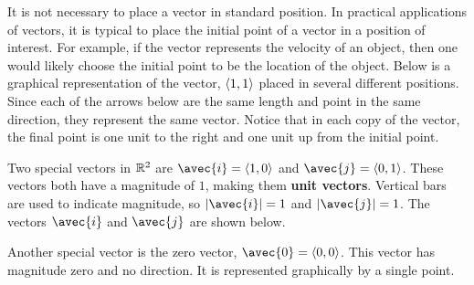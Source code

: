 \documentclass[handout]{ximera}
\begin{document}
It is not necessary to place a vector in standard position.  
In practical applications of vectors, it is typical to place the initial point of a vector in a position of interest.  
For example, if the vector represents the velocity of an object, then one would likely choose the initial point to be the location of the object.
Below is a graphical representation of the vector, $\left\langle 1,1\right\rangle$ placed in several different positions.
Since each of the arrows below are the same length and point in the same direction, they represent the same vector.
Notice that in each copy of the vector, the final point is one unit to the right and one unit up from the initial point. 
\begin{image}
\end{image}

Two special vectors in $\mathbb R^2$ are $\avec{i} = \vector{1,0}$ and $\avec{j} = \vector{0,1}$.
These vectors both have a magnitude of $1$, making them {\bf unit vectors}. 
Vertical bars are used to indicate magnitude, so $|\avec{i}| = 1$ and $|\avec{j}| = 1$.
The vectors $\avec{i}$ and $\avec{j}$ are shown below.

\begin{image}
\end{image}

Another special vector is the zero vector, $\avec{0} = \vector{0,0}$.  
This vector has magnitude zero and no direction.  
It is represented graphically by a single point.
\end{document}
